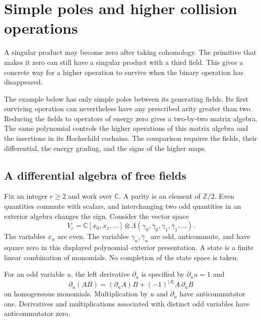 \chapter{Simple poles and higher collision operations}
\label{chap:sc050}

A singular product may become zero after taking cohomology. The
primitive that makes it zero can still have a singular product with a
third field. This gives a concrete way for a higher operation to survive
when the binary operation has disappeared.

The example below has only simple poles between its generating fields.
Its first surviving operation can nevertheless have any prescribed
arity greater than two. Reducing the fields to operators of energy
zero gives a two-by-two matrix algebra. The same polynomial controls
the higher operations of this matrix algebra and the insertions in its
Hochschild cochains. The comparison requires the fields, their
differential, the energy grading, and the signs of the higher maps.

\section{A differential algebra of free fields}
\label{sec:sc050-fields}

Fix an integer \(r\ge2\) and work over \(\mathbb C\). A parity is an
element of \(\mathbb Z/2\). Even quantities commute with scalars, and
interchanging two odd quantities in an exterior algebra changes the
sign. Consider the vector space
\[
 V_r=\mathbb C[x_0,x_1,\ldots]\otimes
       \Lambda(\gamma_0,\bar\gamma_0,\gamma_1,\bar\gamma_1,\ldots).
\]
The variables \(x_n\) are even. The variables \(\gamma_n,\bar\gamma_n\)
are odd, anticommute, and have square zero in this displayed
polynomial--exterior presentation. A state is a finite linear
combination of monomials. No completion of the state space is taken.

For an odd variable \(u\), the left derivative \(\partial_u\) is
specified by \(\partial_u u=1\) and
\[
 \partial_u(AB)=(\partial_u A)B+(-1)^{|A|}A\,\partial_u B
\]
on homogeneous monomials. Multiplication by \(u\) and \(\partial_u\)
have anticommutator one. Derivatives and multiplications associated
with distinct odd variables have anticommutator zero.

